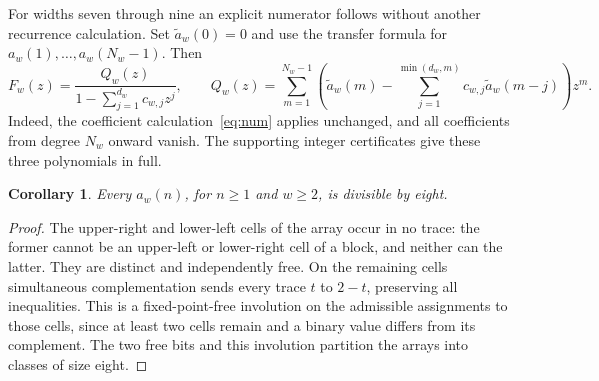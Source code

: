 \documentclass[11pt]{article}
\newtheorem{corollary}[theorem]{Corollary}
\begin{document}
For widths seven through nine an explicit numerator follows without
another recurrence calculation. Set $\widetilde a_w(0)=0$ and use the
transfer formula for $a_w(1),\ldots,a_w(N_w-1)$. Then
\[
 F_w(z)=\frac{Q_w(z)}{1-\sum_{j=1}^{d_w}c_{w,j}z^j},\qquad
 Q_w(z)=\sum_{m=1}^{N_w-1}\left(\widetilde a_w(m)-
 \sum_{j=1}^{\min(d_w,m)}c_{w,j}\widetilde a_w(m-j)\right)z^m.
\]
Indeed, the coefficient calculation~\eqref{eq:num} applies unchanged,
and all coefficients from degree $N_w$ onward vanish.
The supporting integer certificates give these three polynomials in full.

\begin{corollary}\label{cor:divisibility}
Every $a_w(n)$, for $n\ge1$ and $w\ge2$, is divisible by eight.
\end{corollary}
\begin{proof}
The upper-right and lower-left cells of the array occur in no trace:
the former cannot be an upper-left or lower-right cell of a block,
and neither can the latter. They are distinct and independently free.
On the remaining cells simultaneous complementation sends every trace
$t$ to $2-t$, preserving all inequalities. This is a fixed-point-free
involution on the admissible assignments to those cells, since at least
two cells remain and a binary value differs from its complement.
The two free bits and this
involution partition the arrays into classes of size eight.
\end{proof}
\end{document}
